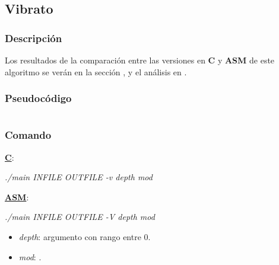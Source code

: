 \subsection{Vibrato}
\label{subsec:desarrollo-vibrato}

\subsubsection{Descripción}
\label{subsec:desarrollo-vibrato-desc}


\vspace{\baselineskip}

Los resultados de la comparación entre las versiones en \textbf{C} y \textbf{ASM} de este algoritmo se verán en la sección , y el análisis en .

\subsubsection{Pseudocódigo}
\label{subsec:desarrollo-vibrato-code}

\lstset{language=C}
\begin{lstlisting}[frame=single]
\end{lstlisting}

\subsubsection{Comando}
\label{subsec:desarrollo-vibrato-call}

\underline{\textbf{C}}:
\begin{center}
 \textit{./main INFILE OUTFILE -v depth mod}
\end{center}

\underline{\textbf{ASM}}:
\begin{center}
 \textit{./main INFILE OUTFILE -V depth mod}
\end{center}

\begin{itemize}
 \item \textit{depth}: argumento con rango entre 0.
 \item \textit{mod}: .
\end{itemize}
 
